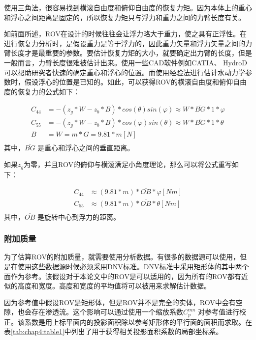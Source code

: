 使用三角法，很容易找到横滚自由度和俯仰自由度的恢复力矩。因为本体上的重心和浮心之间距离是固定的，所以恢复力矩只与浮力和重力之间的力臂长度有关。

如前面所述，ROV在设计的时候往往会让浮力略大于重力，使之具有正浮性。在进行恢复力分析时，是假设重力是等于浮力的，因此重力矢量和浮力矢量之间的力臂长度才是最重要的参数。要估计恢复力矩的大小，就要确定出力臂的长度，但是一般而言，力臂长度很难被估计出来。使用一些CAD软件例如CATIA、 HydroD可以帮助研究者快速的确定重心和浮心的位置。而使用经验法进行估计水动力学参数时，假设浮心的位置是已知的。如此，可以获得ROV的横滚自由度和俯仰自由度的恢复力的公式如下：

\begin{equation}
\begin{aligned}
C_{44} &= -(z_g \ast W-z_b \ast B)\ast cos(\theta) sin(\varphi) \approx W \ast \overline{BG} \ast 1 \ast \varphi \\
C_{55} &= -(z_g \ast W - z_b \ast B) \ast cos(\varphi) sin(\theta) \approx W \ast \overline{BG} \ast 1 \ast \theta\\
B &= W = m \ast G = 9.81 \ast m [N]\\
\label{eq:chap4:restor}
\end{aligned}
\end{equation}
其中，$\overline{BG}$ 是重心和浮心之间的垂直距离。

如果$z_{g}$为零，并且ROV的俯仰与横滚满足小角度理论，那么可以将公式重写如下：

\begin{equation}
\begin{aligned}
C_{44} &\approx (9.81 \ast m) \ast \overline{OB}  \ast \varphi [Nm]\\
C_{55} &\approx (9.81 \ast m) \ast \overline{OB}  \ast \theta [Nm]\\
\end{aligned}
\end{equation}
其中，$\overline{OB}$ 是旋转中心到浮力的距离。

\subsubsection{附加质量}

为了估算ROV的附加质量，就需要使用分析数据。有很多的数据源可以使用，但是在使用这些数据源时候必须采用DNV标准\cite{DNVStard}。DNV标准中采用矩形体的其中两个面作为参考。该假设对于本论文中的ROV是可以适用的，因为所有的ROV都有近似的高度和宽度。高度和宽度的平均值将可以被用来求解估计数据。

因为参考值中假设ROV是矩形体，但是ROV并不是完全的实体，ROV中会有空隙，也会存在渗透流。这个影响可以通过使用一个缩放系数$C_{p}^{mn}$ 对参考值进行校正。该系数是用上标平面内的投影面积除以参考矩形体的平行面的面积而求取。在表\ref{tab:chap4:table1}中列出了用于获得相关投影面积系数的局部坐标系\cite{bertram2012practical}。

